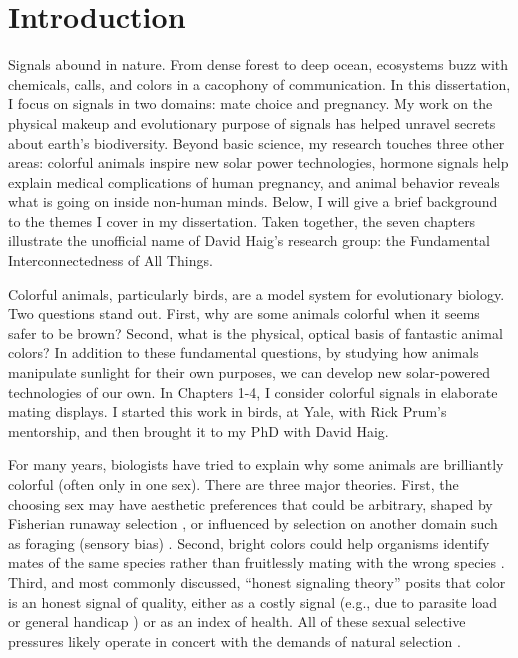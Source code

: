 \chapter{Introduction}
\label{introduction}

Signals abound in nature. From dense forest to deep ocean, ecosystems buzz with chemicals, calls, and colors in a cacophony of communication. In this dissertation, I focus on signals in two domains: mate choice and pregnancy. My work on the physical makeup and evolutionary purpose of signals has helped unravel secrets about earth’s biodiversity. Beyond basic science, my research touches three other areas: colorful animals inspire new solar power technologies, hormone signals help explain medical complications of human pregnancy, and animal behavior reveals what is going on inside non-human minds. Below, I will give a brief background to the themes I cover in my dissertation. Taken together, the seven chapters illustrate the unofficial name of David Haig’s research group: the Fundamental Interconnectedness of All Things.


\large{\newthought{\textcolor{SchoolColor}{1. Colorful Mating Displays}}}

\normalsize Colorful animals, particularly birds, are a model system for evolutionary biology. Two questions stand out. First, why are some animals colorful when it seems safer to be brown? Second, what is the physical, optical basis of fantastic animal colors? In addition to these fundamental questions, by studying how animals manipulate sunlight for their own purposes, we can develop new solar-powered technologies of our own. In Chapters 1-4, I consider colorful signals in elaborate mating displays. I started this work in birds, at Yale, with Rick Prum’s mentorship, and then brought it to my PhD with David Haig. \\

\vspace{5mm}
\noindent{\textcolor{SchoolColor}{1.1 Sexual Selection}}

For many years, biologists have tried to explain why some animals are brilliantly colorful (often only in one sex). There are three major theories. First, the choosing sex may have aesthetic preferences that could be arbitrary\cite{Prum2012}, shaped by Fisherian runaway selection \cite{Fisher1999}, or influenced by selection on another domain such as foraging (sensory bias) \cite{Dawkins1996}. Second, bright colors could help organisms identify mates of the same species rather than fruitlessly mating with the wrong species \cite{Hill2015}. Third, and most commonly discussed, “honest signaling theory” posits that color is an honest signal of quality, either as a costly signal (e.g., due to parasite load \cite{Folstad1992} or general handicap \cite{Zahavi1975}) or as an index of health\cite{Cantarero2019, Cantarero2017, Hill2019, Simons2012, Weaver2018}.  All of these sexual selective pressures likely operate in concert with the demands of natural selection \cite{Endler1984, McQueen2019}.

